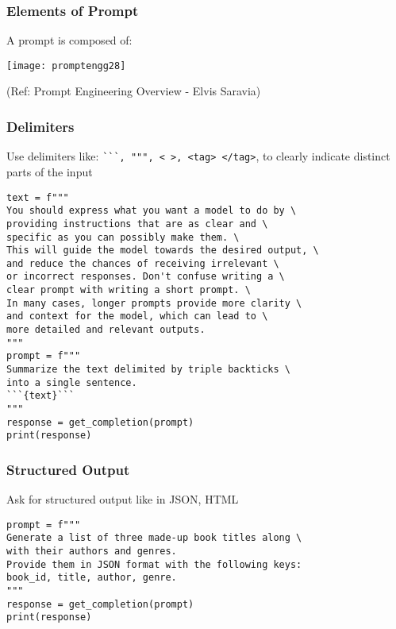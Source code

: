 \begin{frame}[fragile]\frametitle{Elements of Prompt}

A prompt is composed of:

\begin{center}
\texttt{[image: promptengg28]}

{\tiny (Ref: Prompt Engineering Overview - Elvis Saravia)}

\end{center}		
		
\end{frame}
\begin{frame}[fragile]\frametitle{Delimiters}

Use delimiters like: \lstinline|```, """, < >, <tag> </tag>|,  to clearly indicate distinct parts of the input

\begin{lstlisting}
text = f"""
You should express what you want a model to do by \ 
providing instructions that are as clear and \ 
specific as you can possibly make them. \ 
This will guide the model towards the desired output, \ 
and reduce the chances of receiving irrelevant \ 
or incorrect responses. Don't confuse writing a \ 
clear prompt with writing a short prompt. \ 
In many cases, longer prompts provide more clarity \ 
and context for the model, which can lead to \ 
more detailed and relevant outputs.
"""
prompt = f"""
Summarize the text delimited by triple backticks \ 
into a single sentence.
```{text}```
"""
response = get_completion(prompt)
print(response)
\end{lstlisting}
		
		
\end{frame}

\begin{frame}[fragile]\frametitle{Structured Output}

Ask for structured output like in JSON, HTML

\begin{lstlisting}
prompt = f"""
Generate a list of three made-up book titles along \ 
with their authors and genres. 
Provide them in JSON format with the following keys: 
book_id, title, author, genre.
"""
response = get_completion(prompt)
print(response)
\end{lstlisting}
		
		
\end{frame}


